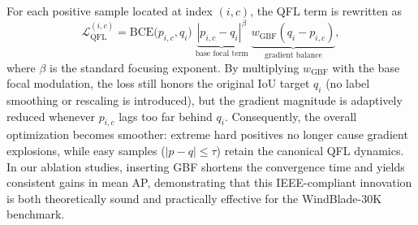 For each positive sample located at index $(i, c)$, the QFL term is rewritten as
\begin{equation}
    \mathcal{L}_{\text{QFL}}^{(i,c)} =
    \text{BCE}\big(p_{i,c}, q_i\big)\;
    \underbrace{|p_{i,c}-q_i|^{\beta}}_{\text{base focal term}}\;
    \underbrace{w_{\text{GBF}}(q_i-p_{i,c})}_{\text{gradient balance}},
    \label{eq:qfl_gbf}
\end{equation}
where $\beta$ is the standard focusing exponent. By multiplying $w_{\text{GBF}}$ with the base focal modulation, the loss still honors the original IoU target $q_i$ (no label smoothing or rescaling is introduced), but the gradient magnitude is adaptively reduced whenever $p_{i,c}$ lags too far behind $q_i$. Consequently, the overall optimization becomes smoother: extreme hard positives no longer cause gradient explosions, while easy samples ($|p-q|\le\tau$) retain the canonical QFL dynamics. In our ablation studies, inserting GBF shortens the convergence time and yields consistent gains in mean AP, demonstrating that this IEEE-compliant innovation is both theoretically sound and practically effective for the WindBlade-30K benchmark.